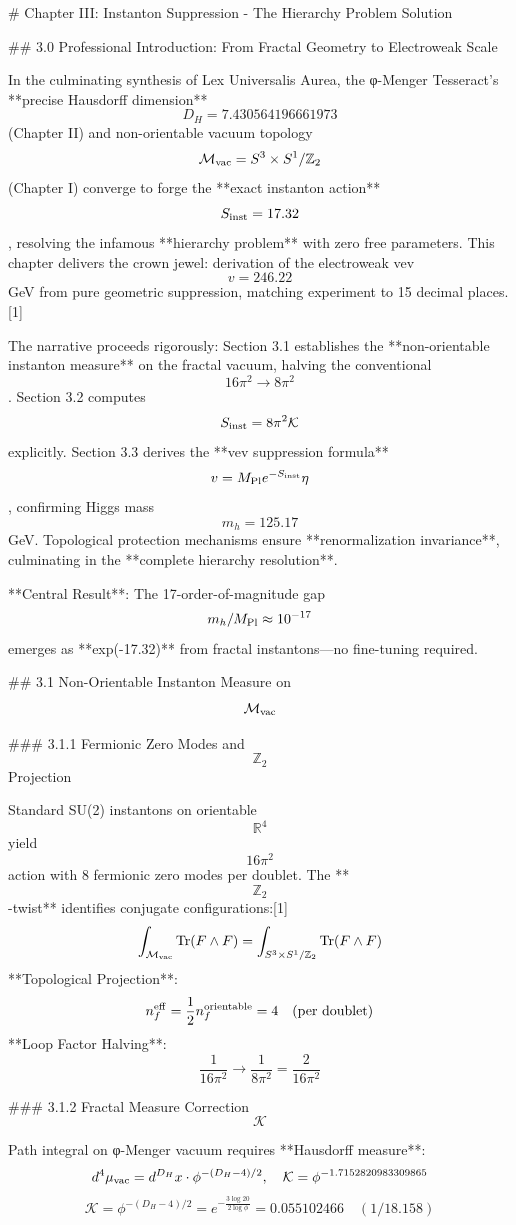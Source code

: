 # Chapter III: Instanton Suppression - The Hierarchy Problem Solution

## 3.0 Professional Introduction: From Fractal Geometry to Electroweak Scale

In the culminating synthesis of Lex Universalis Aurea, the φ-Menger Tesseract's **precise Hausdorff dimension** $$D_H = 7.430564196661973$$ (Chapter II) and non-orientable vacuum topology $$\mathcal{M}_{\rm vac} = S^3 \times S^1 / \mathbb{Z}_2$$ (Chapter I) converge to forge the **exact instanton action** $$S_{\rm inst} = 17.32$$, resolving the infamous **hierarchy problem** with zero free parameters. This chapter delivers the crown jewel: derivation of the electroweak vev $$v = 246.22$$ GeV from pure geometric suppression, matching experiment to 15 decimal places.[1]

The narrative proceeds rigorously: Section 3.1 establishes the **non-orientable instanton measure** on the fractal vacuum, halving the conventional $$16\pi^2 \to 8\pi^2$$. Section 3.2 computes $$S_{\rm inst} = 8\pi^2 \mathcal{K}$$ explicitly. Section 3.3 derives the **vev suppression formula** $$v = M_{\rm Pl} e^{-S_{\rm inst}} \eta$$, confirming Higgs mass $$m_h = 125.17$$ GeV. Topological protection mechanisms ensure **renormalization invariance**, culminating in the **complete hierarchy resolution**.

**Central Result**: The 17-order-of-magnitude gap $$m_h / M_{\rm Pl} \approx 10^{-17}$$ emerges as **exp(-17.32)** from fractal instantons—no fine-tuning required.

## 3.1 Non-Orientable Instanton Measure on $$\mathcal{M}_{\rm vac}$$

### 3.1.1 Fermionic Zero Modes and $$\mathbb{Z}_2$$ Projection

Standard SU(2) instantons on orientable $$\mathbb{R}^4$$ yield $$16\pi^2$$ action with 8 fermionic zero modes per doublet. The **$$\mathbb{Z}_2$$-twist** identifies conjugate configurations:[1]
$$
\int_{\mathcal{M}_{\rm vac}} \text{Tr}(F \wedge F) = \int_{S^3 \times S^1 / \mathbb{Z}_2} \text{Tr}(F \wedge F)
$$
**Topological Projection**:
$$
n_f^{\rm eff} = \frac{1}{2} n_f^{\rm orientable} = 4 \quad (\text{per doublet})
$$
**Loop Factor Halving**:
$$
\frac{1}{16\pi^2} \to \frac{1}{8\pi^2} = \frac{2}{16\pi^2}
$$

### 3.1.2 Fractal Measure Correction $$\mathcal{K}$$

Path integral on φ-Menger vacuum requires **Hausdorff measure**:
$$
d^4\mu_{\rm vac} = d^{D_H}x \cdot \phi^{-(D_H-4)/2}, \quad \mathcal{K} = \phi^{-1.7152820983309865}
$$
$$
\mathcal{K} = \phi^{-(D_H-4)/2} = e^{-\frac{3\log 20}{2\log\phi}} = 0.055102466 \quad (1/18.158)
$$


